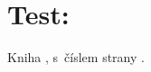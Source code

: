 \documentclass[12pt,a4paper]{article}
\begin{document}
\section*{Test: \STYL}
Kniha \parencite{halliday2013}, s~číslem strany \parencite[s.~45]{halliday2013}.
\nocite{*}
\printbibliography
\end{document}
